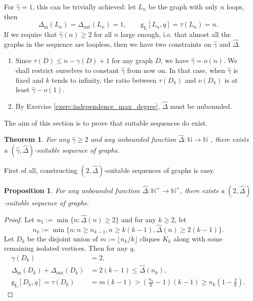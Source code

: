 \documentclass[a4paper, 11pt]{book}
\numberwithin{equation}{section}
\theoremstyle{plain}
\newtheorem{theorem}	[equation]	{Theorem}
\newtheorem{proposition}[equation]	{Proposition}
\newcommand{\dMax}{\Delta}
\newcommand{\inn}[1]{#1_\mathrm{in}}
\newcommand{\out}[1]{#1_\mathrm{out}}
\newcommand{\dInMax}{\inn{\dMax}}
\newcommand{\dOutMax}{\out{\dMax}}
\newcommand{\feedback}{\tau}
\newcommand{\girth}{\gamma}
\newcommand{\packing}{\nu}
\newcommand{\linear}[1]{#1_\mathrm{L}}
\newcommand{\guessing}{\mathrm{g}}
\newcommand{\linearGuessing}{\linear{\guessing}}
\renewcommand{\(}{\ldbrack}
\renewcommand{\)}{\rdbrack}
\newcommand{\N}{\mathbb{N}}
\begin{document}
For $\hat{\gamma} = 1$, this can be trivially achieved: let $L_n$ be the graph with only $n$ loops, then
\[
	\dInMax(L_n) = \dOutMax(L_n) = 1, \qquad \linearGuessing[L_n, q] = \feedback(L_n) = n.
\]
If we require that $\hat{\gamma}(n) \ge 2$ for all $n$ large enough, i.e. that almost all the graphs in the sequence are loopless, then we have two constraints on $\hat{\gamma}$ and $\hat{\Delta}$.
\begin{enumerate}
	\item Since $\feedback(D) \le n - \girth(D) + 1$ for any graph $D$, we have $\hat{\gamma} = o(n)$. We shall restrict ourselves to constant $\hat{\gamma}$ from now on. In that case, when $\hat{\gamma}$ is fixed and $k$ tends to infinity, the ratio between $\feedback(D_k)$ and $\packing(D_k)$ is at least $\hat{\gamma} - o(1)$.
	
	\item By Exercise \ref{exerc:independence_max_degree}, $\hat{\Delta}$ must be unbounded.
\end{enumerate}



The aim of this section is to prove that suitable sequences do exist.

\begin{theorem} \label{th:high_girth_g}
For any $\hat{\gamma} \ge 2$ and any unbounded function $\hat{\Delta} : \N \to \N$ , there exists a $(\hat{\gamma}, \hat{\Delta})$-suitable sequence of graphs.
\end{theorem}



First of all, constructing $(2, \hat{\Delta})$-suitable sequences of graphs is easy.

\begin{proposition} \label{prop:sparse_high_g}
For any unbounded function $\hat{\Delta} : \N^+ \to \N^+$, there exists a $(2, \hat{\Delta})$-suitable sequence of graphs.
\end{proposition}

\begin{proof}
Let $n_1 := \min\{n : \hat{\Delta}(n) \ge 2\}$ and for any $k \ge 2$, let 
\[
	n_k := \min\{ n : n \ge n_{k-1}, n \ge k(k-1), \hat{\Delta}(n) \ge 2(k-1) \}.
\]
Let $D_k$ be the disjoint union of $m := \lfloor n_k/k \rfloor$ cliques $K_k$ along with some remaining isolated vertices. Then for any $q$,
\begin{align*}
	\girth(D_k) &= 2,\\
	\dInMax(D_k) + \dOutMax(D_k) &= 2(k-1) \le \hat{\Delta}(n_k),\\
	\linearGuessing[D_k, q] = \feedback(D_k) &= m(k-1) > \left( \frac{n_k}{k} - 1 \right)(k-1) \ge n_k \left(1 - \frac{2}{k} \right).
\end{align*}
\end{proof}
\end{document}
